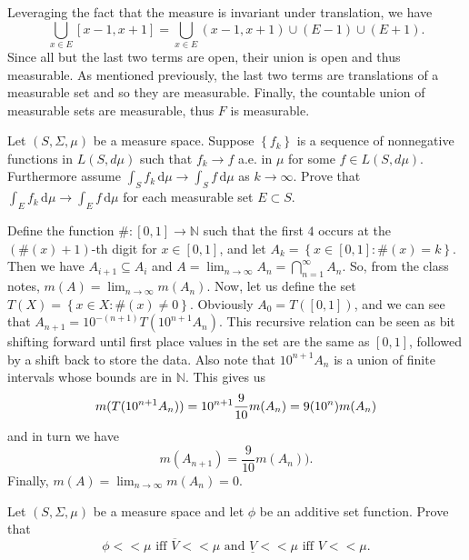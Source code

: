 \begin{solution}
  Leveraging the fact that the measure is invariant under translation, we have
  \[
    \bigcup_{x \in E}[x-1,x+1] = \bigcup_{x \in E} (x-1,x+1) \cup (E - 1) \cup (E+1)
  .\] 
  Since all but the last two terms are open, their union is open and thus measurable.
  As mentioned previously, the last two terms are translations of a measurable set and so they are measurable.
  Finally, the countable union of measurable sets are measurable, thus $F$ is measurable.
\end{solution}

\pagebreak

\begin{problem}{5}
  Let $\left( S, \Sigma, \mu \right)$ be a measure space.
  Suppose $\left\{ f_{k} \right\}$ is a sequence of nonnegative functions in $L\left( S, d \mu \right)$ such that $f_{k} \to f$ a.e. in $\mu$ for some $f\in L\left( S,d \mu \right)$.
  Furthermore assume $\int_{S} \! f_{k} \, \mathrm{d} \mu \to \int_{S} \! f \, \mathrm{d} \mu $ as $k \to \infty$.
  Prove that $\int_{E} \! f_{k} \, \mathrm{d} \mu \to \int_{E} \! f \, \mathrm{d} \mu  $ for each measurable set $E \subset S$.
\end{problem}

\begin{solution}
  Define the function $\# : [0,1] \to \mathbb{N} $ such that the first $4$ occurs at the $(\#(x)+1)$-th digit for $x \in [0,1]$, and let $A_{k} = \left\{ x\in[0,1] : \#(x) = k \right\}$.
  Then we have $A_{i+1} \subseteq A_{i}$ and $A = \lim_{n \to \infty} A_{n} = \bigcap_{n=1}^{ \infty } A_{n} $.
  So, from the class notes, $m(A) = \lim_{n \to \infty} m(A_{n})$.
  Now, let us define the set $T(X) = \left\{ x \in X : \#(x) \neq  0  \right\}$. 
  Obviously $A_{0} = T([0,1])$, and we can see that $A_{n+1} = 10^{-(n+1)}T(10^{n+1}A_{n})$.
  This recursive relation can be seen as bit shifting forward until first place values in the set are the same as $[0,1]$, followed by a shift back to store the data.
  Also note that $10^{n+1}A_{n}$ is a union of finite intervals whose bounds are in $\mathbb{N}$.
  This gives us
  \[
  m(T(10^{n+1}A_{n})) = 10^{n+1} \frac{9}{10} m(A_{n}) = 9(10^{n})m(A_{n}) \\
  \] 
  and in turn we have
  \[
  m(A_{n+1}) = \frac{9}{10}m(A_{n}))
  .\] 
  Finally, $m(A) = \lim_{n \to \infty} m(A_{n}) = 0$.
\end{solution}

\pagebreak

\begin{problem}{6}
  Let $\left( S, \Sigma, \mu \right)$ be a measure space and let $\phi$ be an additive set function.
  Prove that
  \[
  \phi < < \mu \text{ iff } \overline{V} < < \mu \text{ and } \underline{V} < < \mu \text{ iff } V < < \mu
  .\] 
\end{problem}

